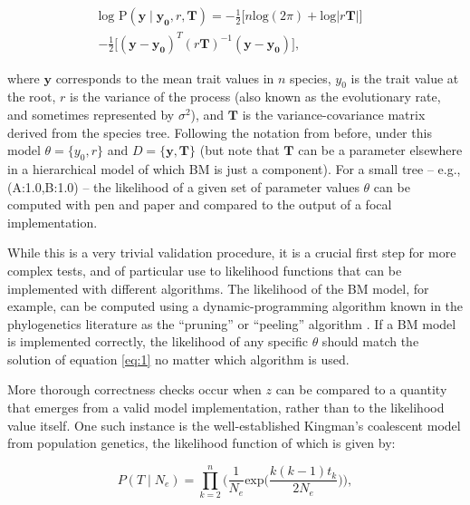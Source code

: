 \documentclass[oneside,twocolumn]{article}
\begin{document}
\begin{equation}
  \begin{split}
    \text{log P}(\mathbf{y} \mid \mathbf{y_0}, r, \mathbf{T}) = -\frac{1}{2} \Big[ n\text{log}(2\pi) + \text{log}|r \mathbf{T}| \Big] & \\
    -\frac{1}{2} \Big[ (\mathbf{y} - \mathbf{y_0})^T (r \mathbf{T})^{-1} (\mathbf{y} - \mathbf{y_0}) \Big],
  \label{eq:1}
  \end{split}
\end{equation}

\noindent where $\mathbf{y}$ corresponds to the mean trait values in $n$ species,
$y_0$ is the trait value at the root, $r$ is the variance of the process
(also known as the evolutionary rate, and sometimes represented by $\sigma^2$), and $\mathbf{T}$ is the
variance-covariance matrix derived from the species tree.
Following the notation from before, under this model $\theta = \{y_0,
r\}$ and $D = \{\mathbf{y, \mathbf{T}} \}$ (but note that $\mathbf{T}$ can
be a parameter elsewhere in a hierarchical model of which BM is just a
component).
For a small tree -- e.g., (A:1.0,B:1.0) -- the likelihood of a given set
of parameter values $\theta$ can be computed with pen and paper and compared to
the output of a focal implementation.

While this is a very trivial validation procedure, it is a crucial first
step for more complex tests, and of particular use to likelihood functions that can be
implemented with different algorithms.
The likelihood of the BM model, for example, can be computed using a
dynamic-programming algorithm known in the phylogenetics literature
as the ``pruning'' or ``peeling'' algorithm \citep{felsenstein73}.
If a BM model is implemented correctly, the likelihood of any specific
$\theta$ should match the solution of equation \ref{eq:1} no matter which algorithm is used.

More thorough correctness checks occur when $z$ can be
compared to a quantity that emerges from a valid model implementation,
rather than to the likelihood value itself.
One such instance is the well-established Kingman's coalescent model \citep{kingman82}
from population genetics, the likelihood function of which is given by:

\begin{equation}
  P(T \mid N_e) = \prod_{k=2}^{n} \Bigg( \frac{1}{N_e} \text{exp} \Bigg(
  \frac{k(k-1)t_k}{2N_e} \Bigg) \Bigg),
  \label{eq:2}
\end{equation}
\end{document}
